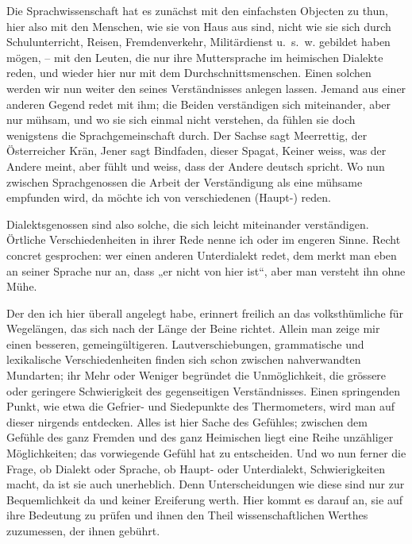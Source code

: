 \largerpage[-1]Die Sprachwissenschaft hat es zunächst mit den einfachsten Objecten zu thun, hier also mit den Menschen, wie sie von Haus aus sind, nicht wie sie sich durch Schulunterricht, Reisen, Fremdenverkehr, Militärdienst u.~s.~w. gebildet haben mögen, – mit den Leuten, die nur ihre Muttersprache im heimischen Dialekte reden, und wieder hier nur mit dem Durchschnittsmenschen. Einen solchen werden wir nun weiter den  seines Verständnisses anlegen lassen. Jemand aus einer anderen Gegend redet mit ihm; die Beiden verständigen sich miteinander, \label{fp.58} aber nur mühsam, und wo sie sich einmal nicht verstehen, da fühlen sie doch wenigstens die Sprachgemeinschaft durch. Der Sachse sagt Meerrettig, der Österreicher Krän, Jener sagt Bindfaden, dieser Spagat, Keiner weiss, was der Andere meint, aber  fühlt und weiss, dass der Andere deutsch spricht. Wo nun zwischen Sprachgenossen die Arbeit der Verständigung als eine mühsame empfunden wird, da möchte ich von verschiedenen (Haupt-)  reden.

\begin{sloppypar}Dialektsgenossen sind also solche, die sich leicht miteinander verständigen. Örtliche Verschiedenheiten in ihrer Rede nenne ich  oder  im engeren Sinne. Recht concret gesprochen: wer einen anderen Unterdialekt redet, dem merkt man eben an seiner Sprache nur an, dass „er nicht von hier ist“, aber man versteht ihn ohne Mühe.\end{sloppypar}

Der  den ich hier überall angelegt habe, erinnert freilich an das volks\-thümliche  für Wegelängen, das sich nach der Länge der Beine richtet. Allein man zeige mir einen besseren, gemeingültigeren. Lautverschiebungen, grammatische und lexikalische Verschiedenheiten finden sich schon zwischen nahverwandten Mundarten; ihr Mehr oder Weniger begründet die Unmöglichkeit, die grössere oder geringere Schwierigkeit des gegenseitigen Verständnisses. Einen springenden Punkt, wie etwa die Gefrier- und Siedepunkte des Thermometers, wird man auf dieser  nirgends entdecken. Alles ist hier Sache des Gefühles; zwischen dem Gefühle des ganz Fremden und des ganz Heimischen liegt eine Reihe unzähliger Möglichkeiten; das vorwiegende Gefühl hat zu entscheiden. Und wo nun ferner die Frage, ob Dialekt oder Sprache, ob Haupt- oder Unterdialekt, Schwierigkeiten macht, da ist sie auch unerheblich. Denn Unterscheidungen wie diese sind nur zur Bequemlichkeit da \label{sp.58} und keiner Ereiferung werth. Hier kommt es darauf an, sie auf ihre Bedeutung  zu prüfen und ihnen den Theil wissenschaftlichen Werthes zuzumessen, der ihnen gebührt.

